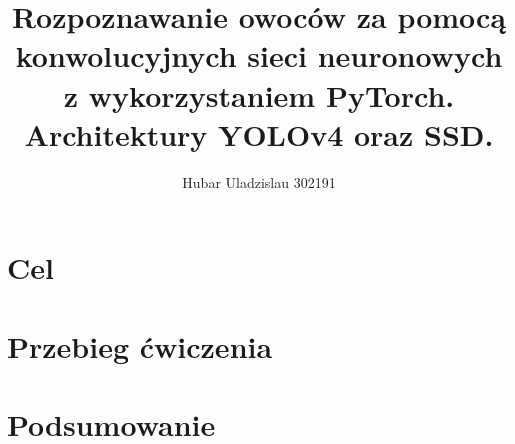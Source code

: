 \documentclass[a4paper,11pt]{article}
\begin{document}
\title{Rozpoznawanie owoców za pomocą konwolucyjnych sieci neuronowych z wykorzystaniem PyTorch. Architektury YOLOv4 oraz SSD.}


\author{Hubar Uladzislau 302191}

\maketitle

\section{Cel}

\section{Przebieg ćwiczenia}

\newpage
\section{Podsumowanie}
\end{document}
